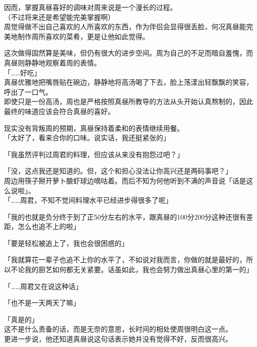 因而，掌握真昼喜好的调味对周来说是一个漫长的过程。\\

（不过将来还是希望能完美掌握啊）\\

周觉得做不出自己喜欢的人所喜欢的东西，作为伴侣会显得很丢脸，何况真昼能完美地制作周所喜欢的菜肴，更是让他如此觉得。

这次做得固然算是美味，但仍有很大的进步空间。周为自己的不足而暗自羞愧，而真昼则静静地观察着周的表情。\\

「……好吃」\\

真昼优雅地把嘴唇贴在碗边，静静地将高汤喝了下去，脸上荡漾出轻飘飘的笑容，呼出了一口气。\\

即使只是一份高汤，周也是严格按照真昼所教导的方法从头开始认真熬制的，因此最终的味道应该会符合真昼的喜好。

现实没有背叛周的预期，真昼保持着柔和的表情继续用餐。\\

「太好了，看来合你的口味。说实话，我还挺紧张的」

「我虽然评判过周君的料理，但应该从来没有抱怨过吧？」

「没，这点我还是知道的。但，这个和担心没法让你高兴还是两码事吧？」\\

周边用筷子掰开萝卜酿虾球边嘀咕着。而后不知为何他听到不满的声音说「话是这么说啦」。\\

「……周君，不知不觉间料理水平已经进步得很多了呢」

「我的也就是负分终于到了正50分左右的水平，跟真昼的100分200分这种还很有差距，怎么也追不上的啦」

「要是轻松被追上了，我也会很困惑的」

「我就算花一辈子也追不上你的水平了，不如说对我而言，你做的就是最好的，所以不论我的厨艺如何都无关紧要。话虽如此，我也会努力做出真昼心里的第一的」

「……周君又在说这种话」

「也不是一天两天了嘛」

「真是的」\\

这不是什么责备的话，而是无奈的意思，长时间的相处使周很明白这一点。\\

更进一步说，他还知道真昼说这句话表示她并没有觉得不好，反而很高兴。\\

